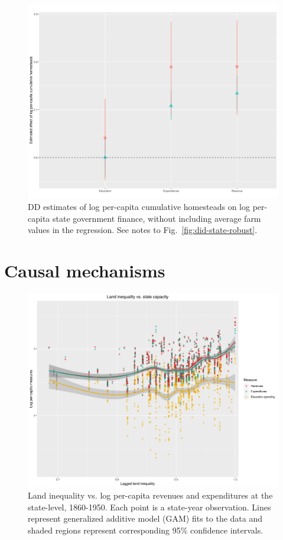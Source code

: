 \documentclass[12pt]{article}
\begin{document}
\begin{figure}[htbp]
\begin{center}
		\includegraphics[width=\textwidth]{plots/did-state.png}
\end{center}
\caption{DD estimates of log per-capita cumulative homesteads on log per-capita state government finance, without including average farm values in the regression. See notes to Fig.~\ref{fig:did-state-robust}. \label{fig:did-state}}
\end{figure}	

\pagebreak
\section{Causal mechanisms}

\begin{figure}[htbp]
	\begin{center}
		\includegraphics[width=1\textwidth]{plots/ineq-capacity.png} 
	\end{center}
	\caption{Land inequality vs. log per-capita revenues and expenditures at the state-level, 1860-1950. Each point is a state-year observation. Lines represent generalized additive model (GAM) fits to the data and shaded regions represent corresponding 95\% confidence intervals.   \label{fig:ineq-capacity}}
\end{figure} 
\end{document}
